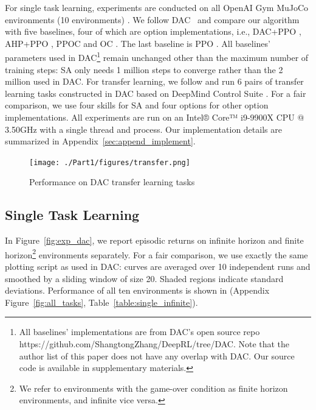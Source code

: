 For single task learning, experiments are conducted on all OpenAI
Gym MuJoCo environments (10 environments)
\cite{brockman2016openai}. We follow DAC~\cite{zhang2019dac} and
compare our algorithm with five baselines, four of which are
option implementations, i.e., DAC+PPO \cite{zhang2019dac},
AHP+PPO \cite{levy2011unified}, PPOC
\cite{klissarov2017learnings} and OC \cite{bacon2017option}. The
last baseline is PPO \cite{schulman2017proximal}. All baselines'
parameters used in DAC\footnote{All baselines' implementations
  are from DAC's open source repo
  https://github.com/ShangtongZhang/DeepRL/tree/DAC. Note that
  the author list of this paper does not have any overlap with
  DAC. Our source code is available in supplementary materials.}
remain unchanged other than the maximum number of training steps:
SA only needs 1 million steps to converge rather than the 2
million used in DAC. For transfer learning, we follow
 and run 6 pairs of transfer learning
tasks constructed in DAC based on DeepMind Control Suite
\cite{tassa2020dmcontrol}. For a fair comparison, we use four
skills for SA and four options for other option implementations.
All experiments are run on an Intel® Core™ i9-9900X CPU @ 3.50GHz
with a single thread and process. Our implementation details are
summarized in Appendix~\ref{sec:append_implement}.

\begin{figure}[h]
  \vspace{-2mm}
  \centering
  \texttt{[image: ./Part1/figures/transfer.png]}\\
  \vspace{-4mm}
  \caption{\label{fig:transfer} Performance on DAC transfer
    learning tasks}
  \vspace{-4mm}
\end{figure}

\subsection{Single Task Learning}
\label{sec:exp_perf}
\vspace{-2mm}
In Figure~\ref{fig:exp_dac}, we report episodic returns on
infinite horizon and finite horizon\footnote{We refer to
  environments with the game-over condition as finite horizon
  environments, and infinite vice versa.} environments
separately. For a fair comparison, we use exactly the same
plotting script as used in DAC: curves are averaged over 10
independent runs and smoothed by a sliding window of size 20.
Shaded regions indicate standard deviations. Performance of all
ten environments is shown in (Appendix
Figure~\ref{fig:all_tasks}, Table~\ref{table:single_infinite}).

